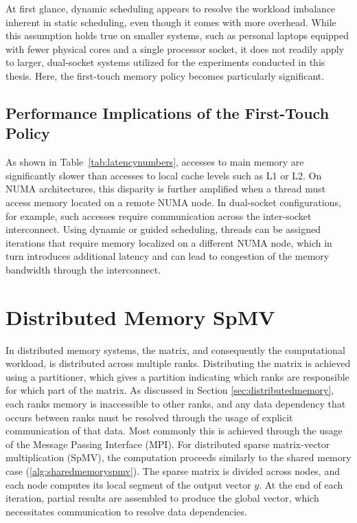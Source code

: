 At first glance, dynamic scheduling appears to resolve the workload imbalance inherent in static scheduling, even though it comes with more overhead. While this assumption holds true on smaller systems, such as personal laptops equipped with fewer physical cores and a single processor socket, it does not readily apply to larger, dual-socket systems utilized for the experiments conducted in this thesis. Here, the first-touch memory policy becomes particularly significant.


\subsection{Performance Implications of the First-Touch Policy}
As shown in Table~\ref{tab:latencynumbers}, accesses to main memory are significantly slower than accesses to local cache levels such as L1 or L2. On NUMA architectures, this disparity is further amplified when a thread must access memory located on a remote NUMA node. In dual-socket configurations, for example, such accesses require communication across the inter-socket interconnect. Using dynamic or guided scheduling, threads can be assigned iterations that require memory localized on a different NUMA node, which in turn introduces additional latency and can lead to congestion of the memory bandwidth through the interconnect.

\section{Distributed Memory SpMV}
In distributed memory systems, the matrix, and consequently the computational workload, is distributed across multiple ranks. Distributing the matrix is achieved using a partitioner, which gives a partition indicating which ranks are responsible for which part of the matrix. As discussed in Section \ref{sec:distributedmemory}, each ranks memory is inaccessible to other ranks, and any data dependency that occurs between ranks must be resolved through the usage of explicit communication of that data. Most commonly this is achieved through the usage of the Message Passing Interface (MPI). For distributed sparse matrix-vector multiplication (SpMV), the computation proceeds similarly to the shared memory case (\autoref{alg:sharedmemoryspmv}). The sparse matrix is divided across nodes, and each node computes its local segment of the output vector \(y\). At the end of each iteration, partial results are assembled to produce the global vector, which necessitates communication to resolve data dependencies.
\medskip

